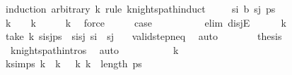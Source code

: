 \begin{isabellebody}
\ {\isacharparenleft}{\kern0pt}induction\ arbitrary{\isacharcolon}{\kern0pt}\ k\ rule{\isacharcolon}{\kern0pt}\ knights{\isacharunderscore}{\kern0pt}path{\isachardot}{\kern0pt}induct{\isacharparenright}{\kern0pt}\isanewline
\ \ \isamarkupfalse%
\ {\isacharparenleft}{\kern0pt}{}\ s\isactrlsub i\ b\ s\isactrlsub j\ ps{\isacharparenright}{\kern0pt}\isanewline
\ \ \isamarkupfalse%
\ \isamarkupfalse%
\ {\isachardoublequoteopen}k\ {\isacharequal}{\kern0pt}\ {}\ {\isasymor}\ k\ {\isacharequal}{\kern0pt}\ {}\ {\isasymor}\ {}\ {\isacharless}{\kern0pt}\ k{\isachardoublequoteclose}\ \isamarkupfalse%
\ force\isanewline
\ \ \isamarkupfalse%
\ \isamarkupfalse%
\ {\isacharquery}{\kern0pt}case\isanewline
\ \ \ \ \isamarkupfalse%
\ {}\isanewline
\ \ \isamarkupfalse%
\ {\isacharparenleft}{\kern0pt}elim\ disjE{\isacharparenright}{\kern0pt}\isanewline
\ \ \ \ \isamarkupfalse%
\ {\isachardoublequoteopen}k\ {\isacharequal}{\kern0pt}\ {}{\isachardoublequoteclose}\isanewline
\ \ \ \ \isamarkupfalse%
\ \isamarkupfalse%
\ {\isachardoublequoteopen}take\ k\ {\isacharparenleft}{\kern0pt}s\isactrlsub i{\isacharhash}{\kern0pt}s\isactrlsub j{\isacharhash}{\kern0pt}ps{\isacharparenright}{\kern0pt}\ {\isacharequal}{\kern0pt}\ {\isacharbrackleft}{\kern0pt}s\isactrlsub i{\isacharcomma}{\kern0pt}s\isactrlsub j{\isacharbrackright}{\kern0pt}{\isachardoublequoteclose}\ {\isachardoublequoteopen}s\isactrlsub i\ {\isasymnotin}\ {\isacharbraceleft}{\kern0pt}s\isactrlsub j{\isacharbraceright}{\kern0pt}{\isachardoublequoteclose}\ \isamarkupfalse%
\ {}\ valid{\isacharunderscore}{\kern0pt}step{\isacharunderscore}{\kern0pt}neq\ \isamarkupfalse%
\ auto\isanewline
\ \ \ \ \isamarkupfalse%
\ \isamarkupfalse%
\ {\isacharquery}{\kern0pt}thesis\ \isamarkupfalse%
\ {}\ knights{\isacharunderscore}{\kern0pt}path{\isachardot}{\kern0pt}intros\ \isamarkupfalse%
\ auto\isanewline
\ \ \isamarkupfalse%
\isanewline
\ \ \ \ \isamarkupfalse%
\ {\isachardoublequoteopen}{}\ {\isacharless}{\kern0pt}\ k{\isachardoublequoteclose}\isanewline
\ \ \ \ \isamarkupfalse%
\ \isamarkupfalse%
\ k{\isacharunderscore}{\kern0pt}simps{\isacharcolon}{\kern0pt}\ {\isachardoublequoteopen}k{\isacharminus}{\kern0pt}{}\ {\isacharequal}{\kern0pt}\ k{\isacharminus}{\kern0pt}{}{\isacharminus}{\kern0pt}{}{\isachardoublequoteclose}\ {\isachardoublequoteopen}{}\ {\isacharless}{\kern0pt}\ k{\isacharminus}{\kern0pt}{}{\isachardoublequoteclose}\ {\isachardoublequoteopen}k{\isacharminus}{\kern0pt}{}\ {\isacharless}{\kern0pt}\ length\ ps{\isachardoublequoteclose}\ \isanewline

\end{isabellebody}
